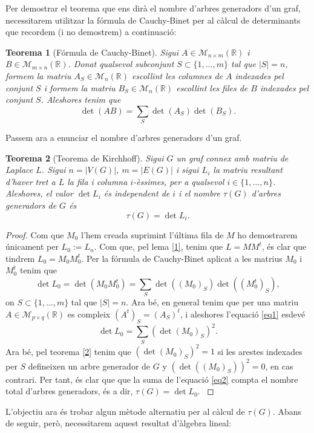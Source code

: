 \documentclass{article}
\newtheorem{theorem}{Teorema}[section]
\begin{document}
Per demostrar el teorema que ens dirà el nombre d'arbres generadors d'un graf, necessitarem utilitzar la fórmula de Cauchy-Binet per al càlcul de determinants que recordem (i no demostrem) a continuació:
\begin{theorem}[Fórmula de Cauchy-Binet]
    Sigui $A\in\mathcal{M}_{n\times m}(\mathbb{R})$ i $B\in\mathcal{M}_{m\times n}(\mathbb{R})$. Donat qualsevol subconjunt $S\subset\{1,\ldots,m\}$ tal que $|S|=n$, formem la matriu $A_S\in\mathcal{M}_n(\mathbb{R})$ escollint les columnes de $A$ indexades pel conjunt $S$ i formem la matriu $B_S\in\mathcal{M}_n(\mathbb{R})$ escollint les files de $B$ indexades pel conjunt $S$. Aleshores tenim que $$\det(AB)=\sum_S\det(A_S)\det(B_S).$$
\end{theorem}
Passem ara a enunciar el nombre d'arbres generadors d'un graf.
\begin{theorem}[Teorema de Kirchhoff]
    Sigui $G$ un graf connex amb matriu de Laplace $L$. Sigui $n=|V(G)|$, $m=|E(G)|$ i sigui $L_i$ la matriu resultant d'haver tret a $L$ la fila i columna $i$-èssimes, per a qualsevol $i\in\{1,\ldots,n\}$. Aleshores, el valor $\det L_i$ és independent de $i$ i el nombre $\tau(G)$ d'arbres generadors de $G$ és $$\tau(G)=\det L_i.$$
\end{theorem}
\begin{proof}
    Com que $M_0$ l'hem creada suprimint l'última fila de $M$ ho demostrarem únicament per $L_0:=L_n$. Com que, pel lema \ref{1}, tenim que $L=MM^t$, és clar que tindrem $L_0=M_0M_0^t$.
    Per la fórmula de Cauchy-Binet aplicat a les matrius $M_0$ i $M_0^t$ tenim que \begin{equation}
        \det L_0=\det(M_0M_0^t)=\sum_S\det((M_0)_S)\det((M_0^t)_S),
        \label{eq1}
    \end{equation} on $S\subset\{1,\ldots,m\}$ tal que $|S|=n$. Ara bé, en general tenim que per una matriu $A\in\mathcal{M}_{p\times q}(\mathbb{R})$ es compleix $(A^t)_S=(A_S)^t$, i aleshores l'equació \ref{eq1} esdevé
    \begin{equation}
        \det L_0=\sum_S(\det(M_0)_S)^2.
        \label{eq2}
    \end{equation}
    Ara bé, pel teorema \ref{2} tenim que $(\det(M_0)_S)^2=1$ si les arestes indexades per $S$ defineixen un arbre generador de $G$ y $(\det((M_0)_S))^2=0$, en cas contrari. Per tant, és clar que que la suma de l'equació \ref{eq2} compta el nombre total d'arbres generadors, és a dir, $\tau(G)=\det L_0$. \cite{2}
\end{proof}
L'objectiu ara és trobar algun mètode alternatiu per al càlcul de $\tau(G)$. Abans de seguir, però, necessitarem aquest resultat d'àlgebra lineal:
\end{document}
